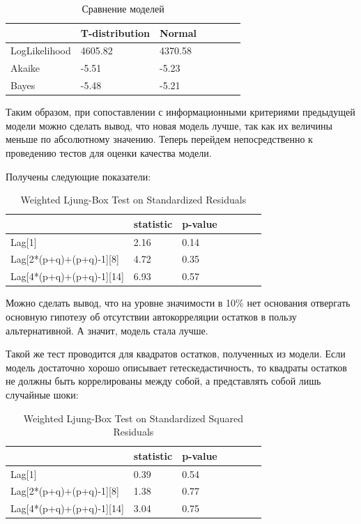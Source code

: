 \documentclass[a4paper,12pt,twoside]{article}
\begin{document}
\begin{table}[!h]
\centering
\begin{tabular}{lllllll}
  \hline
          &  T-distribution & Normal  \\
  \hline
  LogLikelihood & 4605.82 &  4370.58 \\
  Akaike  & -5.51 &  -5.23  \\
  Bayes & -5.48 &  -5.21 \\
  \hline
\end{tabular}
\caption{Сравнение моделей}
\end{table}

Таким образом, при сопоставлении с информационными критериями предыдущей модели можно сделать вывод, что новая модель лучше, так как их величины меньше по абсолютному значению.
Теперь перейдем непосредственно к проведению тестов для оценки качества модели.

Получены следующие показатели:

\begin{table}[!h]
\centering
\begin{tabular}{lllllll}
  \hline
          &  statistic  &  p-value  \\
  \hline
  Lag[1]  & 2.16 & 0.14 \\
  Lag[2*(p+q)+(p+q)-1][8]  & 4.72 &  0.35 \\
  Lag[4*(p+q)+(p+q)-1][14]  & 6.93 &  0.57 \\
  \hline
\end{tabular}
\caption{Weighted Ljung-Box Test on Standardized Residuals}
\end{table}

Можно сделать вывод, что на уровне значимости в 10\% нет основания отвергать основную гипотезу об отсутствии автокорреляции остатков в пользу альтернативной. А значит, модель стала лучше.

Такой же тест проводится для квадратов остатков, полученных из модели.
Если модель достаточно хорошо описывает гетескедастичность, то квадраты остатков не должны быть коррелированы между собой, а представлять собой лишь случайные шоки:

\begin{table}[!h]
\centering
\begin{tabular}{lllllll}
  \hline
          &  statistic  &  p-value  \\
  \hline
  Lag[1]  & 0.39 & 0.54 \\
  Lag[2*(p+q)+(p+q)-1][8]  & 1.38 &  0.77 \\
  Lag[4*(p+q)+(p+q)-1][14]  & 3.04 &  0.75 \\
  \hline
\end{tabular}
\caption{Weighted Ljung-Box Test on Standardized Squared Residuals}
\end{table}
\end{document}
